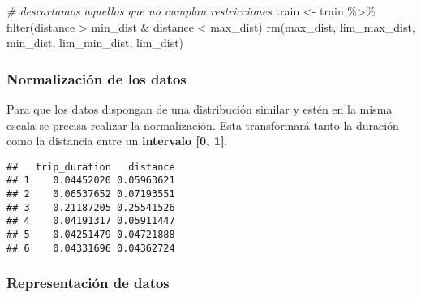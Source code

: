 \documentclass[
]{article}
\newenvironment{Shaded}{\begin{snugshade}}{\end{snugshade}}
\newcommand{\CommentTok}[1]{\textcolor[rgb]{0.56,0.35,0.01}{\textit{#1}}}
\newcommand{\FunctionTok}[1]{\textcolor[rgb]{0.00,0.00,0.00}{#1}}
\newcommand{\NormalTok}[1]{#1}
\newcommand{\OtherTok}[1]{\textcolor[rgb]{0.56,0.35,0.01}{#1}}
\newcommand{\SpecialCharTok}[1]{\textcolor[rgb]{0.00,0.00,0.00}{#1}}
\begin{document}
\begin{Shaded}
\begin{Highlighting}[]
\CommentTok{\# descartamos aquellos que no cumplan restricciones}
\NormalTok{train }\OtherTok{\textless{}{-}}\NormalTok{ train }\SpecialCharTok{\%\textgreater{}\%} \FunctionTok{filter}\NormalTok{(distance }\SpecialCharTok{\textgreater{}}\NormalTok{ min\_dist }\SpecialCharTok{\&}\NormalTok{ distance }\SpecialCharTok{\textless{}}\NormalTok{ max\_dist)}
\FunctionTok{rm}\NormalTok{(max\_dist, lim\_max\_dist, min\_dist, lim\_min\_dist, lim\_dist)}
\end{Highlighting}
\end{Shaded}

\hypertarget{normalizaciuxf3n-de-los-datos}{%
\subsubsection{Normalización de los
datos}\label{normalizaciuxf3n-de-los-datos}}

Para que los datos dispongan de una distribución similar y estén en la
misma escala se precisa realizar la normalización. Esta transformará
tanto la duración como la distancia entre un \textbf{intervalo {[}0,
1{]}}.

\begin{Shaded}
\end{Shaded}

\begin{verbatim}
##   trip_duration   distance
## 1    0.04452020 0.05963621
## 2    0.06537652 0.07193551
## 3    0.21187205 0.25541526
## 4    0.04191317 0.05911447
## 5    0.04251479 0.04721888
## 6    0.04331696 0.04362724
\end{verbatim}

\hypertarget{representaciuxf3n-de-datos}{%
\subsubsection{Representación de
datos}\label{representaciuxf3n-de-datos}}
\end{document}
